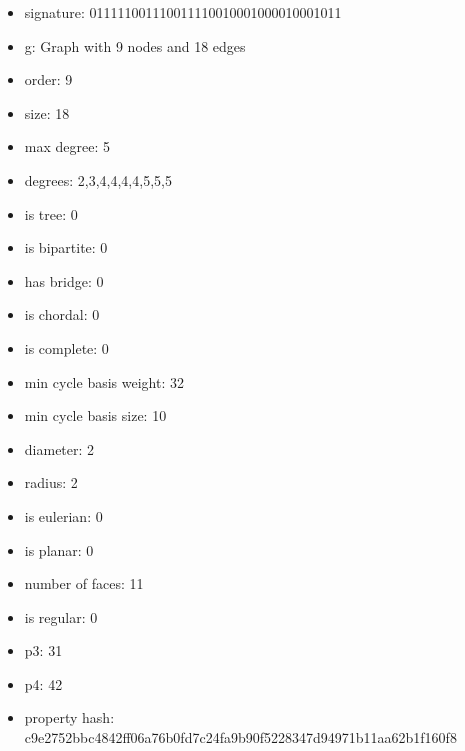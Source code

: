 \newpage
\begin{figure}
\end{figure}
\begin{itemize}
\item signature: 011111001110011110010001000010001011
\item g: Graph with 9 nodes and 18 edges
\item order: 9
\item size: 18
\item max degree: 5
\item degrees: 2,3,4,4,4,4,5,5,5
\item is tree: 0
\item is bipartite: 0
\item has bridge: 0
\item is chordal: 0
\item is complete: 0
\item min cycle basis weight: 32
\item min cycle basis size: 10
\item diameter: 2
\item radius: 2
\item is eulerian: 0
\item is planar: 0
\item number of faces: 11
\item is regular: 0
\item p3: 31
\item p4: 42
\item property hash: c9e2752bbc4842ff06a76b0fd7c24fa9b90f5228347d94971b11aa62b1f160f8
\end{itemize}
